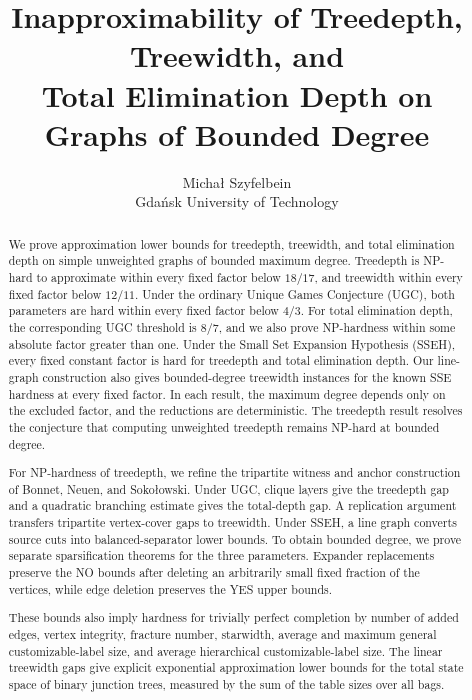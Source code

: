 \documentclass[11pt,letterpaper]{article}
\title{Inapproximability of Treedepth, Treewidth, and\\
Total Elimination Depth on Graphs of Bounded Degree}
\author{Micha\l{} Szyfelbein\\
\small Gda\'nsk University of Technology}
\date{}
\begin{document}
\maketitle

\begin{abstract}
We prove approximation lower bounds for treedepth, treewidth, and
total elimination depth on simple unweighted graphs of bounded
maximum degree. Treedepth is \textup{NP}-hard to approximate within every
fixed factor below $18/17$, and treewidth within every fixed factor
below $12/11$. Under the ordinary Unique Games Conjecture (\textup{UGC}), both
parameters are hard within every fixed factor below $4/3$. For total
elimination depth, the corresponding \textup{UGC} threshold is $8/7$, and we
also prove \textup{NP}-hardness within some absolute factor greater than one.
Under the Small Set Expansion Hypothesis (\textup{SSEH}), every fixed constant factor
is hard for treedepth and total elimination depth. Our line-graph
construction also gives bounded-degree treewidth instances for the
known \textup{SSE} hardness at every fixed factor. In each result, the maximum
degree depends only on the excluded factor, and the reductions are
deterministic. The treedepth result resolves the conjecture that
computing unweighted treedepth remains \textup{NP}-hard at bounded degree.

For \textup{NP}-hardness of treedepth, we refine the tripartite witness and
anchor construction of Bonnet, Neuen, and Soko\l owski. Under \textup{UGC},
clique layers give the treedepth gap and a quadratic branching
estimate gives the total-depth gap. A replication argument transfers
tripartite vertex-cover gaps to treewidth. Under \textup{SSEH}, a line graph
converts source cuts into balanced-separator lower bounds. To obtain
bounded degree, we prove separate sparsification theorems for the
three parameters. Expander replacements preserve the NO bounds after
deleting an arbitrarily small fixed fraction of the vertices, while
edge deletion preserves the YES upper bounds.

These bounds also imply hardness for trivially perfect completion by
number of added edges, vertex integrity, fracture number, starwidth,
average and maximum general customizable-label size, and average
hierarchical customizable-label size. The linear treewidth gaps
give explicit exponential approximation lower bounds for the total
state space of binary junction trees, measured by the sum of the table
sizes over all bags.
\end{abstract}
\end{document}
